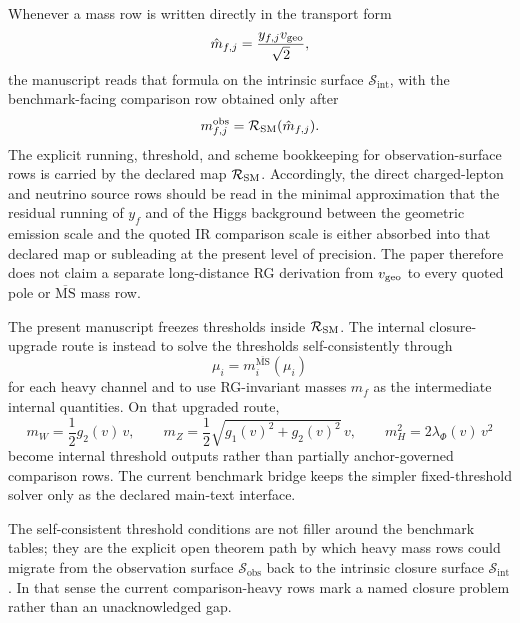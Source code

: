 \begin{remark}
Whenever a mass row is written directly in the transport form
\[
\hat m_{f,j}=\frac{y_{f,j}v_{\mathrm{geo}}}{\sqrt2},
\]
the manuscript reads that formula on the intrinsic surface $\mathcal S_{\mathrm{int}}$, with the benchmark-facing comparison row obtained only after
\[
m_{f,j}^{\mathrm{obs}}=\mathcal R_{\mathrm{SM}}(\hat m_{f,j}).
\]
The explicit running, threshold, and scheme bookkeeping for observation-surface rows is carried by the declared map $\mathcal R_{\mathrm{SM}}$. Accordingly, the direct charged-lepton and neutrino source rows should be read in the minimal approximation that the residual running of $y_f$ and of the Higgs background between the geometric emission scale and the quoted IR comparison scale is either absorbed into that declared map or subleading at the present level of precision. The paper therefore does not claim a separate long-distance RG derivation from $v_{\mathrm{geo}}$ to every quoted pole or $\overline{\mathrm{MS}}$ mass row.
\end{remark}

\begin{proposition}
The present manuscript freezes thresholds inside $\mathcal R_{\mathrm{SM}}$. The internal closure-upgrade route is instead to solve the thresholds self-consistently through
\[
\mu_i=m_i^{\overline{\mathrm{MS}}}(\mu_i)
\]
for each heavy channel and to use RG-invariant masses $\hat m_f$ as the intermediate internal quantities. On that upgraded route,
\[
m_W=\frac12 g_2(v)\,v,
\qquad
m_Z=\frac12\sqrt{g_1(v)^2+g_2(v)^2}\,v,
\qquad
m_H^2=2\lambda_\Phi(v)\,v^2
\]
become internal threshold outputs rather than partially anchor-governed comparison rows. The current benchmark bridge keeps the simpler fixed-threshold solver only as the declared main-text interface.
\end{proposition}

\begin{remark}
The self-consistent threshold conditions are not filler around the benchmark tables; they are the explicit open theorem path by which heavy mass rows could migrate from the observation surface $\mathcal S_{\mathrm{obs}}$ back to the intrinsic closure surface $\mathcal S_{\mathrm{int}}$. In that sense the current comparison-heavy rows mark a named closure problem rather than an unacknowledged gap.
\end{remark}

